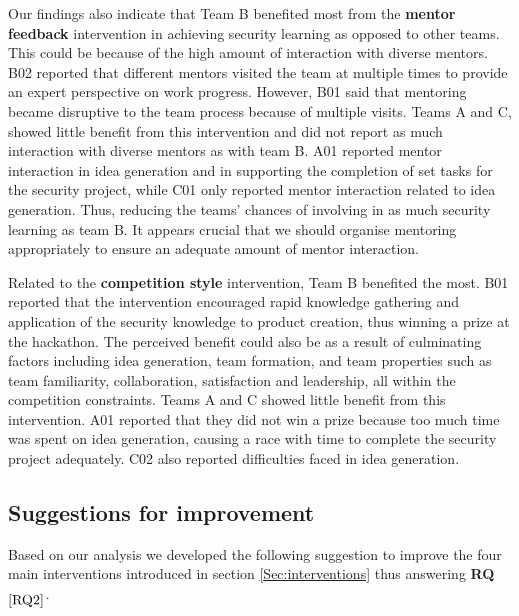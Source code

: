 \documentclass[runningheads]{llncs}
\newcommand{\hr}[1]{\textbf{RQ}$_{\ref{#1}}$}
\begin{document}
Our findings also indicate that Team B benefited most from the \textbf{mentor feedback} intervention in achieving security learning as opposed to other teams. This could be because of the high amount of interaction with diverse mentors. B02 reported that different mentors visited the team at multiple times to provide an expert perspective on work progress. However, B01 said that mentoring became disruptive to the team process because of multiple visits.
Teams A and C, showed little benefit from this intervention and did not report as much interaction with diverse mentors as with team B. 
A01 reported mentor interaction in idea generation and in supporting the completion of set tasks for the security project, while C01 only reported mentor interaction related to idea generation. Thus, reducing the teams' chances of involving in as much security learning as team B. 
It appears crucial that we should organise mentoring appropriately to ensure an adequate amount of mentor interaction.

Related to the \textbf{competition style} intervention, Team B benefited the most. B01 reported that the intervention encouraged rapid knowledge gathering and application of the security knowledge to product creation, thus winning a prize at the hackathon.
The perceived benefit could also be as a result of culminating factors including idea generation, team formation, and team properties such as team familiarity, collaboration, satisfaction and leadership, all within the competition constraints. Teams A and C showed little benefit from this intervention.
A01 reported that they did not win a prize because too much time was spent on idea generation, causing a race with time to complete the security project adequately. C02 also reported difficulties faced in idea generation.

\subsection{Suggestions for improvement}
Based on our analysis we developed the following suggestion to improve the four main interventions introduced in section \ref{Sec:interventions} thus answering \hr{RQ2}.
\end{document}
